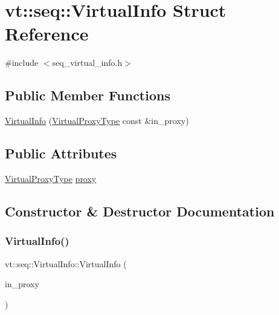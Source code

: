 \hypertarget{structvt_1_1seq_1_1_virtual_info}{}\section{vt\+:\+:seq\+:\+:Virtual\+Info Struct Reference}
\label{structvt_1_1seq_1_1_virtual_info}


{\ttfamily \#include $<$seq\+\_\+virtual\+\_\+info.\+h$>$}

\subsection*{Public Member Functions}
\begin{DoxyCompactItemize}
\item 
\hyperlink{structvt_1_1seq_1_1_virtual_info_a268c499c45afd49f7d7236231f65b15d}{Virtual\+Info} (\hyperlink{namespacevt_a1b417dd5d684f045bb58a0ede70045ac}{Virtual\+Proxy\+Type} const \&in\+\_\+proxy)
\end{DoxyCompactItemize}
\subsection*{Public Attributes}
\begin{DoxyCompactItemize}
\item 
\hyperlink{namespacevt_a1b417dd5d684f045bb58a0ede70045ac}{Virtual\+Proxy\+Type} \hyperlink{structvt_1_1seq_1_1_virtual_info_a7370df453a7e65bf2f177dd988d8d089}{proxy}
\end{DoxyCompactItemize}


\subsection{Constructor \& Destructor Documentation}
\mbox{\label{structvt_1_1seq_1_1_virtual_info_a268c499c45afd49f7d7236231f65b15d}} 
\subsubsection{\texorpdfstring{Virtual\+Info()}{VirtualInfo()}}
{\footnotesize\ttfamily vt\+::seq\+::\+Virtual\+Info\+::\+Virtual\+Info (\begin{DoxyParamCaption}\item[{\hyperlink{namespacevt_a1b417dd5d684f045bb58a0ede70045ac}{Virtual\+Proxy\+Type} const \&}]{in\+\_\+proxy }\end{DoxyParamCaption})\hspace{0.3cm}{\ttfamily [inline]}}



